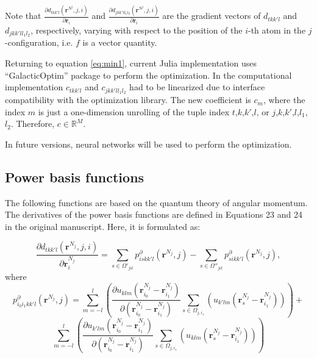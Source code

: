 \documentclass[12pt]{article}
\begin{document}
Note that $ \frac{\partial d_{tkk'l}(\bm r^{N^j}, j, i)}{\partial \bm r_i}$ and $ \frac{\partial d_{jkk'l{l_1}{l_2}}(\bm r^{N^j}, j, i)}{\partial \bm r_i}$
 are the gradient vectors of $d_{tkk'l}$ and $d_{jkk'l{l_1}{l_2}}$, respectively, varying with respect to the position of the $i$-th atom in the $j$-configuration, i.e. $f$ is a vector quantity.


Returning to equation \ref{eq:min1}, current Julia implementation uses ``GalacticOptim'' package to perform the optimization. In the computational implementation $c_{tkk'l}$ and $c_{jkk'l{l_1}{l_2}}$ had to be linearized due to interface compatibility with the optimization library. The new coefficient is $c_{m}$, where the index $m$ is just a one-dimension unrolling of the tuple index $t$,$k$,$k'$,$l$, or $j$,$k$,$k'$,$l$,$l_1$,$l_2$. Therefore, $c \in \mathbb{R}^M$.

In future versions, neural networks will be used to perform the optimization.

\subsection{Power basis functions}

The following functions are based on the quantum theory of angular momentum. The derivatives of the power basis functions are defined in Equations 23 and 24 in the original manuscript. Here, it is formulated as:

\begin{equation}
    \label{eq:derd}
    \frac{\partial d_{tkk'l}(\bm r^{N_j}, j, i)}{\partial \bm r^{N_j}_i} = \sum_{s \in \Omega'_{jit}} p_{iskk'l}^{\partial}(\bm r^{N_j}, j) - \sum_{s \in \Omega''_{jit}} p_{sikk'l}^{\partial} ( \bm r^{N_j}, j),
\end{equation}
where 
\begin{equation}
    p_{i_0i_1kk'l}^{\partial}(\bm r^{N_j}, j) = \sum_{m=-l}^l \left( \frac{\partial u_{klm}(\bm r_{i_0}^{N_j}- \bm r_{i_1}^{N_j})}{\partial (\bm r_{i_0}^{N_j}-\bm r_{i_1}^{N_j})} \sum_{s \in \Omega_{j,i_1}} \left( u_{k'lm} (\bm r^{N_j}_s- \bm r^{N_j}_{i_1}) \right) \right) + 
\end{equation}
\begin{equation*}
\sum_{m=-l}^l \left( \frac{\partial u_{k'lm}(\bm r_{i_0}^{N_j}- \bm r_{i_1}^{N_j})}{\partial (\bm r_{i_0}^{N_j}- \bm r_{i_1}^{N_j})} \sum_{s \in \Omega_{j,i_1}} \left( u_{klm} (\bm r^{N_j}_s- \bm r^{N_j}_{i_1}) \right) \right)
\end{equation*}
\end{document}
